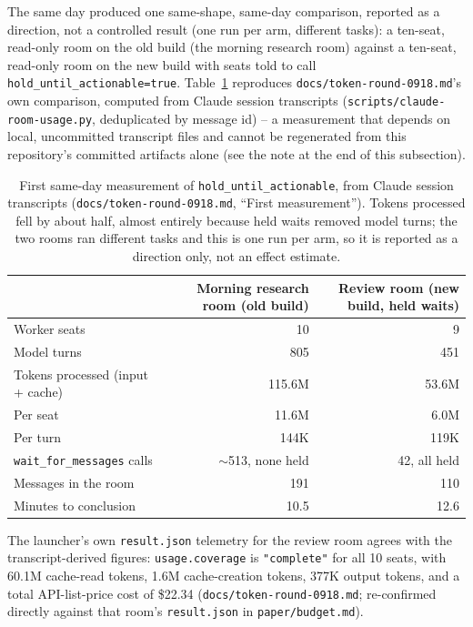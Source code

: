 The same day produced one same-shape, same-day comparison, reported as a direction, not
a controlled result (one run per arm, different tasks): a ten-seat, read-only room on the
old build (the morning research room) against a ten-seat, read-only room on the new
build with seats told to call \texttt{hold\_until\_actionable=true}. Table~\ref{tab:token-round-first-measurement}
reproduces \texttt{docs/token-round-0918.md}'s own comparison, computed from Claude
session transcripts (\texttt{scripts/claude-room-usage.py}, deduplicated by message id) --
a measurement that depends on local, uncommitted transcript files and cannot be
regenerated from this repository's committed artifacts alone (see the note at the end of
this subsection).

\begin{table}[h]
\centering
\small
\begin{tabular}{lrr}
\toprule
 & Morning research room (old build) & Review room (new build, held waits) \\
\midrule
Worker seats & 10 & 9 \\
Model turns & 805 & 451 \\
Tokens processed (input + cache) & 115.6M & 53.6M \\
Per seat & 11.6M & 6.0M \\
Per turn & 144K & 119K \\
\texttt{wait\_for\_messages} calls & $\sim$513, none held & 42, all held \\
Messages in the room & 191 & 110 \\
Minutes to conclusion & 10.5 & 12.6 \\
\bottomrule
\end{tabular}
\caption{First same-day measurement of \texttt{hold\_until\_actionable}, from Claude
session transcripts (\texttt{docs/token-round-0918.md}, ``First measurement''). Tokens
processed fell by about half, almost entirely because held waits removed model turns;
the two rooms ran different tasks and this is one run per arm, so it is reported as a
direction only, not an effect estimate.}
\label{tab:token-round-first-measurement}
\end{table}

The launcher's own \texttt{result.json} telemetry for the review room agrees with the
transcript-derived figures: \texttt{usage.coverage} is \texttt{"complete"} for all 10
seats, with 60.1M cache-read tokens, 1.6M cache-creation tokens, 377K output tokens, and
a total API-list-price cost of \$22.34 (\texttt{docs/token-round-0918.md}; re-confirmed
directly against that room's \texttt{result.json} in \texttt{paper/budget.md}).

